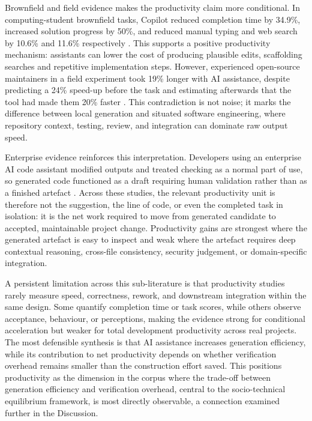 Brownfield and field evidence makes the productivity claim more conditional. In computing-student brownfield tasks, Copilot reduced completion time by 34.9\%, increased solution progress by 50\%, and reduced manual typing and web search by 10.6\% and 11.6\% respectively \cite{shihab_effects_2025}. This supports a positive productivity mechanism: assistants can lower the cost of producing plausible edits, scaffolding searches and repetitive implementation steps. However, experienced open-source maintainers in a field experiment took 19\% longer with AI assistance, despite predicting a 24\% speed-up before the task and estimating afterwards that the tool had made them 20\% faster \cite{becker_measuring_2025}. This contradiction is not noise; it marks the difference between local generation and situated software engineering, where repository context, testing, review, and integration can dominate raw output speed.

Enterprise evidence reinforces this interpretation. Developers using an enterprise AI code assistant modified outputs and treated checking as a normal part of use, so generated code functioned as a draft requiring human validation rather than as a finished artefact \cite{weisz_examining_2025}. Across these studies, the relevant productivity unit is therefore not the suggestion, the line of code, or even the completed task in isolation: it is the net work required to move from generated candidate to accepted, maintainable project change. Productivity gains are strongest where the generated artefact is easy to inspect and weak where the artefact requires deep contextual reasoning, cross-file consistency, security judgement, or domain-specific integration.

A persistent limitation across this sub-literature is that productivity studies rarely measure speed, correctness, rework, and downstream integration within the same design. Some quantify completion time or task scores, while others observe acceptance, behaviour, or perceptions, making the evidence strong for conditional acceleration but weaker for total development productivity across real projects. The most defensible synthesis is that AI assistance increases generation efficiency, while its contribution to net productivity depends on whether verification overhead remains smaller than the construction effort saved. This positions productivity as the dimension in the corpus where the trade-off between generation efficiency and verification overhead, central to the socio-technical equilibrium framework, is most directly observable, a connection examined further in the Discussion.

